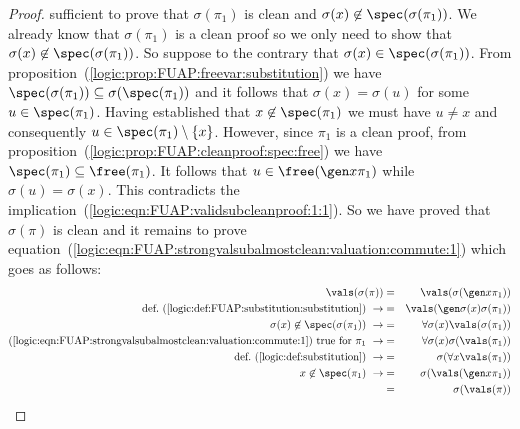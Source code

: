 \begin{proof}
sufficient to prove that $\sigma(\pi_{1})$ is clean and
$\sigma(x)\not\in\spec(\sigma(\pi_{1}))$. We already know that
$\sigma(\pi_{1})$ is a clean proof so we only need to show that
$\sigma(x)\not\in\spec(\sigma(\pi_{1}))$. So suppose to the contrary
that $\sigma(x)\in\spec(\sigma(\pi_{1}))$. From
proposition~(\ref{logic:prop:FUAP:freevar:substitution}) we have
$\spec(\sigma(\pi_{1}))\subseteq\sigma(\spec(\pi_{1}))$ and it
follows that $\sigma(x)=\sigma(u)$ for some $u\in\spec(\pi_{1})$.
Having established that $x\not\in\spec(\pi_{1})$ we must have $u\neq
x$ and consequently $u\in\spec(\pi_{1})\setminus\{x\}$. However,
since $\pi_{1}$ is a clean proof, from
proposition~(\ref{logic:prop:FUAP:cleanproof:spec:free}) we have
$\spec(\pi_{1})\subseteq\free(\pi_{1})$. It follows that
$u\in\free(\gen x\pi_{1})$ while $\sigma(u)=\sigma(x)$. This
contradicts the
implication~(\ref{logic:eqn:FUAP:validsubcleanproof:1:1}). So we
have proved that $\sigma(\pi)$ is clean and it remains to prove
equation~(\ref{logic:eqn:FUAP:strongvalsubalmostclean:valuation:commute:1})
which goes as follows:
    \begin{eqnarray*}
    \vals(\sigma(\pi))&=&\vals(\sigma(\gen x\pi_{1}))\\
    \mbox{def.~(\ref{logic:def:FUAP:substitution:substitution})}\ \rightarrow
    &=&\vals(\gen\sigma(x)\sigma(\pi_{1}))\\
    \sigma(x)\not\in\spec(\sigma(\pi_{1}))\ \rightarrow
    &=&\forall\sigma(x)\vals(\sigma(\pi_{1}))\\
    \mbox{(\ref{logic:eqn:FUAP:strongvalsubalmostclean:valuation:commute:1})
     true for $\pi_{1}$}\ \rightarrow
    &=&\forall\sigma(x)\sigma(\vals(\pi_{1}))\\
    \mbox{def.~(\ref{logic:def:substitution})}\ \rightarrow
    &=&\sigma(\forall x\vals(\pi_{1}))\\
    x\not\in\spec(\pi_{1})\ \rightarrow
    &=&\sigma(\vals(\gen x\pi_{1}))\\
    &=&\sigma(\vals(\pi))\\
    \end{eqnarray*}
\end{proof}

